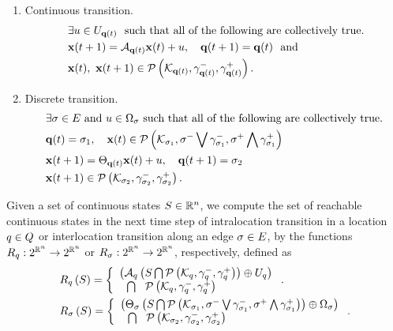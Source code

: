 \begin{enumerate}
\item Continuous transition.
\begin{align}~\label{eqn:intralocation}
\begin{split}
& \exists u\in U_{{\bf q}(t)}~~\text{such that all of
    the following  are collectively true.}\\
& {\bf x}(t+1) = \mathcal{A}_{{\bf q}(t)}{\bf x}(t)+u,~~~{\bf q}(t+1) = {\bf q}(t)~~
\text{and}\\
& {\bf x}(t),~{\bf x}(t+1)\in\mathcal{P}\left(\mathcal{K}_{{\bf q}(t)},\gamma^-_{{\bf q}(t)},\gamma^+_{{\bf q}(t)}\right).
\end{split}
\end{align}
\item Discrete transition.
\begin{align} 
\begin{split}
& \exists \sigma\in E~\text{and}~u\in\Omega_{\sigma}~\text{such
that all of the following are collectively true.}\\
& {\bf q}(t)=\sigma_{1},~~~{\bf x}(t)\in\mathcal{P}\left(\mathcal{K}_{\sigma_{1}},\sigma^-\bigvee\gamma^-_{\sigma_{1}},\sigma^+\bigwedge\gamma^+_{\sigma_{1}}\right) \\
& {\bf x}(t+1) = \Theta_{{\bf q}(t)}{\bf x}(t)+u,~~~{\bf q}(t+1)
= \sigma_{2}\\
& {\bf x}(t+1)\in \mathcal{P}\left(\mathcal{K}_{\sigma_{2}},\gamma^-_{\sigma_{2}},\gamma^+_{\sigma_{2}}\right).
\end{split}
\end{align}
\end{enumerate}

Given a set of continuous states $S\in\mathbb{R}^n$, we compute the set
of reachable continuous states in the next time step of intralocation transition
in a location $q\in Q$ or interlocation transition along
an edge $\sigma\in E$, by the functions
$R_{q}:2^{\mathbb{R}^n}\rightarrow 2^{\mathbb{R}^n}$ or
$R_{\sigma}:2^{\mathbb{R}^n}\rightarrow 2^{\mathbb{R}^n}$,
respectively, defined as
\begin{align*}
&R_{q}\left(S\right) = \left\{\begin{array}{l}{\left(\mathcal{A}_{q}\left(S\bigcap\mathcal{P}\left(\mathcal{K}_{q},\gamma^-_{q},\gamma^+_{q}\right)\right)\oplus
U_q\right)}\\{~~\bigcap~~\mathcal{P}\left(\mathcal{K}_{q},\gamma^-_{q},\gamma^+_{q}\right)} \end{array}\right..\\
&R_{\sigma}\left(S\right) =  \left\{\begin{array}{l}{\left(\Theta_\sigma\left(S\bigcap
\mathcal{P}\left(\mathcal{K}_{\sigma_{1}},\sigma^-\bigvee\gamma^-_{\sigma_{1}},\sigma^+\bigwedge\gamma^+_{\sigma_{1}}\right)\right)\oplus\Omega_\sigma\right)}\\{~~\bigcap~~\mathcal{P}\left(\mathcal{K}_{\sigma_{2}},\gamma^-_{\sigma_{2}},\gamma^+_{\sigma_{2}}\right)} \end{array}\right..
\end{align*}

